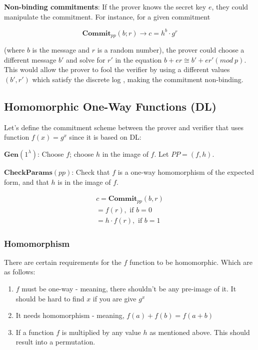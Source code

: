 \documentclass{article}
\begin{document}
\textbf{Non-binding commitments}: If the prover knows the secret key $e$, they could manipulate the commitment. For instance, for a given commitment 

\[
\mathbf{Commit}_{pp}(b;r) \rightarrow c = h^b \cdot g^r
\]

(where $b$ is the message and $r$ is a random number), the prover could choose a different message $b'$ and solve for $r'$ in the equation $b + er \cong b' + er' (mod \: p)$. This would allow the prover to fool the verifier by using a different values $(b', r')$ which satisfy the discrete log , making the commitment non-binding.


\subsection{Homomorphic One-Way Functions (DL)}

Let's define the commitment scheme between the prover and verifier that uses function $f(x) = g^x$ since it is based on DL:

$\mathbf{Gen}(1^{\lambda})$: Choose $f$; choose $h$ in the image of $f$. Let $PP = (f,h)$.

$\mathbf{CheckParams}(pp)$: Check that $f$ is a one-way homomorphism of the expected form, and that $h$ is in the image of $f$.

\begin{align*}
    c = \mathbf{Commit}_{pp}(b,r) \\
    = f(r), \text{ if } b = 0 \\
    = h \cdot f(r), \text{ if } b = 1
\end{align*}


\subsubsection{Homomorphism}
There are certain requirements for the $f$ function to be homomorphic. Which are as follows:

\begin{enumerate}
    \item $f$ must be one-way - meaning, there shouldn't be any pre-image of it. It should be hard to find $x$ if you are give $g^x$
    \item It needs homomorphism - meaning, $f(a) + f(b) = f(a+b)$
    \item If a function $f$ is multiplied by any value $h$ as mentioned above. This should result into a permutation.
\end{enumerate}
\end{document}
